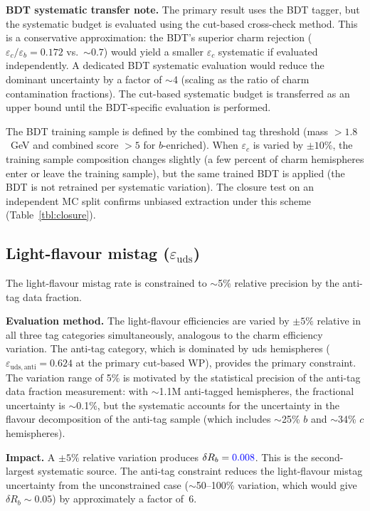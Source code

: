 \documentclass[11pt,a4paper]{article}
\newcommand{\measured}[1]{\textcolor{blue}{#1}}
\begin{document}
\textbf{BDT systematic transfer note.}
The primary result uses the BDT tagger, but the systematic budget is
evaluated using the cut-based cross-check method.  This is a conservative
approximation: the BDT's superior charm rejection
($\varepsilon_c/\varepsilon_b = 0.172$ vs.\ $\sim 0.7$) would yield a
smaller $\varepsilon_c$ systematic if evaluated independently.  A
dedicated BDT systematic evaluation would reduce the dominant uncertainty
by a factor of $\sim$4 (scaling as the ratio of charm contamination
fractions).  The cut-based systematic budget is transferred as an upper
bound until the BDT-specific evaluation is performed.

The BDT training sample is defined by the combined tag threshold
(mass $> 1.8$~GeV and combined score $> 5$ for $b$-enriched).  When
$\varepsilon_c$ is varied by $\pm 10\%$, the training sample composition
changes slightly (a few percent of charm hemispheres enter or leave the
training sample), but the same trained BDT is applied (the BDT is not
retrained per systematic variation).  The closure test on an independent
MC split confirms unbiased extraction under this scheme
(Table~\ref{tbl:closure}).

\subsection{Light-flavour mistag ($\varepsilon_\mathrm{uds}$)}
\label{sec:syst-epsuds}

The light-flavour mistag rate is constrained to $\sim$5\% relative
precision by the anti-tag data fraction.

\textbf{Evaluation method.}
The light-flavour efficiencies are varied by $\pm 5\%$ relative in all
three tag categories simultaneously, analogous to the charm efficiency
variation.  The anti-tag category, which is dominated by uds hemispheres
($\varepsilon_\mathrm{uds,anti} = 0.624$ at the primary cut-based WP),
provides the primary constraint.  The variation range of 5\% is motivated
by the statistical precision of the anti-tag data fraction measurement:
with $\sim$1.1M anti-tagged hemispheres, the fractional uncertainty is
$\sim$0.1\%, but the systematic accounts for the uncertainty in the
flavour decomposition of the anti-tag sample (which includes $\sim$25\%
$b$ and $\sim$34\% $c$ hemispheres).

\textbf{Impact.}
A $\pm 5\%$ relative variation produces $\delta R_b = \measured{0.008}$.
This is the second-largest systematic source.  The anti-tag constraint
reduces the light-flavour mistag uncertainty from the unconstrained case
($\sim$50--100\% variation, which would give $\delta R_b \sim 0.05$) by
approximately a factor of~6.
\end{document}
